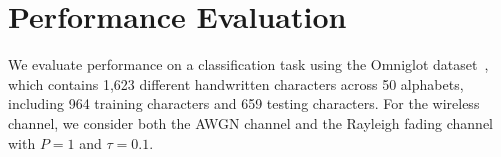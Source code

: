 \section{Performance Evaluation}
\label{sec:simulation}

We evaluate performance on a classification task using the Omniglot dataset~\cite{lake2015human}, which contains 1,623 different handwritten characters across 50 alphabets, including 964 training characters and 659 testing characters. For the wireless channel, we consider both the AWGN channel and the Rayleigh fading channel with $P=1$ and $\tau =0.1$.

